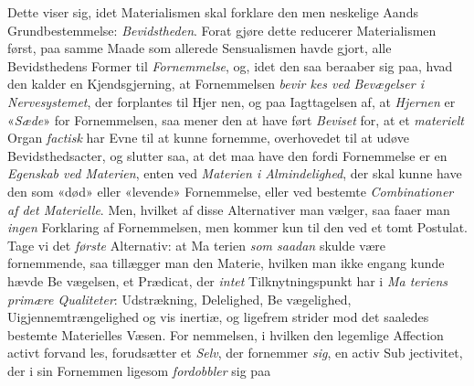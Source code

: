 Dette viser sig, idet Materialismen skal forklare den men\-%
neskelige Aands Grundbestemmelse: \emph{Bevidstheden}. Forat
gjøre dette reducerer Materialismen først, paa samme Maade
som allerede Sensualismen havde gjort, alle Bevidsthedens
Former til \emph{Fornemmelse}, og, idet den saa beraaber sig paa,
hvad den kalder en Kjendsgjerning, at Fornemmelsen \emph{bevir\-%
kes ved Bevægelser i Nervesystemet}, der forplantes til Hjer\-%
nen, og paa Iagttagelsen af, at \emph{Hjernen} er «\emph{Sæde}» for
Fornemmelsen, saa mener den at have ført \emph{Beviset} for, at
et \emph{materielt} Organ \emph{factisk} har Evne til at kunne fornemme,
overhovedet til at udøve Bevidsthedsacter, og slutter saa, at
det maa have den fordi Fornemmelse er en \emph{Egenskab ved
Materien}, enten ved \emph{Materien i Almindelighed}, der
skal kunne have den som «død» eller «levende» Fornemmelse,
eller ved bestemte \emph{Combinationer af det Materielle}.
Men, hvilket af disse Alternativer man vælger, saa faaer man
\emph{ingen} Forklaring af Fornemmelsen, men kommer kun til den
ved et tomt Postulat. Tage vi det \emph{første} Alternativ: at Ma\-%
terien \emph{som saadan} skulde være fornemmende, saa tillægger
man den Materie, hvilken man ikke engang kunde hævde Be\-%
vægelsen, et Prædicat, der \emph{intet} Tilknytningspunkt har i \emph{Ma\-%
teriens primære Qualiteter}: Udstrækning, Delelighed, Be\-%
vægelighed, Uigjennemtrængelighed og vis inertiæ, og ligefrem
strider mod det saaledes bestemte Materielles Væsen. For\-%
nemmelsen, i hvilken den legemlige Affection activt forvand\-%
les, forudsætter et \emph{Selv}, der fornemmer \emph{sig}, en activ Sub\-%
jectivitet, der i sin Fornemmen ligesom \emph{fordobbler} sig paa
